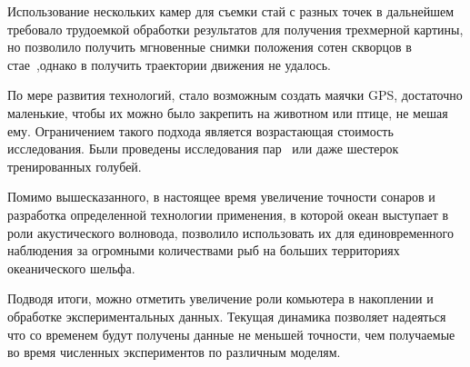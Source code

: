 	Использование нескольких камер для съемки стай с разных точек в дальнейшем требовало трудоемкой обработки результатов для получения трехмерной картины, но позволило получить мгновенные снимки положения сотен скворцов в стае~\cite{ballerini2008},однако в получить траектории движения не удалось.

	По мере развития технологий, стало возможным создать маячки GPS, достаточно маленькие, чтобы их можно было закрепить на животном или птице, не мешая ему. Ограничением такого подхода является возрастающая стоимость исследования. Были проведены исследования пар~\cite{biro2006,nagy2010} или даже шестерок~\cite{dellariccia2008} тренированных голубей.

	Помимо вышесказанного, в настоящее время увеличение точности сонаров и разработка определенной технологии применения, в которой океан выступает в роли акустического волновода, позволило использовать их для единовременного наблюдения за огромными количествами рыб на больших территориях океанического шельфа.~\cite{makris2006}

	Подводя итоги, можно отметить увеличение роли комьютера в накоплении и обработке экспериментальных данных. Текущая динамика позволяет надеяться что со временем будут получены данные не меньшей точности, чем получаемые во время численных экспериментов по различным моделям.
